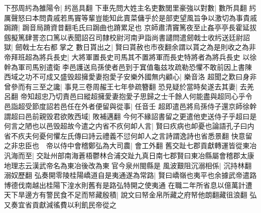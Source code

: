 下邳周䊸為雒陽令|{
	䊸邕具翻}
下車先問大姓主名吏數閭里豪強以對數|{
	數所具翻}
䊸厲聲怒曰本問貴戚若馬竇等輩豈能知此賣菜傭乎於是部吏望風旨争以激切為事貴戚跼蹐|{
	跼音局蹐資昔翻毛氏曰跼曲也蹐累足也}
京師肅清竇篤夜至止姦亭亭長霍延拔劔擬篤肆詈恣口篤以表聞詔召司隸校尉河南尹詣尚書譴問遣劒戟士收䊸送廷尉詔獄|{
	劒戟士左右都掌之}
數日貰出之|{
	賢曰貰赦也市夜翻余謂以貰之為是則收之為非}
帝拜班超為將兵長史|{
	大將軍置長史司馬其不置將軍而長史特將者為將兵長史}
以徐幹為軍司馬别遣衛李邑護送烏孫使者邑到于窴值龜兹攻疏勒恐懼不敢前因上書陳西域之功不可成又盛毁超擁愛妻抱愛子安樂外國無内顧心|{
	樂音洛}
超聞之歎曰身非曾參而有三至之讒|{
	事見三卷周赧王七年參疏簪翻}
恐見疑於當時矣遂去其妻|{
	去羌呂翻}
帝知超忠乃切責邑曰縱超擁愛妻抱愛子思歸之士千餘人何能盡與超同心乎令邑詣超受節度詔若邑任在外者便留與從事|{
	任音壬}
超即遣邑將烏孫侍子還京師徐幹謂超曰邑前親毁君欲敗西域|{
	敗補邁翻}
今何不緣詔書留之更遣他吏送侍子乎超曰是何言之陋也以邑毁超故今遣之内省不疚何卹人言|{
	賢曰疚病也卹憂也論語孔子曰内省不疚夫何憂何懼左氏傳曰詩云禮義不愆何卹人之言詩謂逸詩也省悉景翻}
快意留之非忠臣也　帝以侍中會稽鄭弘為大司農|{
	會工外翻}
舊交趾七郡貢獻轉運皆從東冶汎海而至|{
	交趾州部南海蒼梧鬱林合浦交趾九真日南七郡賢曰東冶縣屬會稽郡太康地理志云漢武帝名為東冶後改為東官今泉州閩縣是}
風波艱阻沉溺相係|{
	沉持林翻溺奴歷翻}
弘奏開零陵桂陽嶠道自是夷通遂為常路|{
	賢曰嶠嶺也夷平也余據武帝遣路博德伐南越出桂陽下湟水則舊有是路弘特開之使夷通}
在職二年所省息以億萬計遭天下旱邊方有警民食不足而帑藏殷積|{
	說文曰帑金帛所藏之府帑他朗翻藏徂浪翻}
弘又奏宜省貢獻減徭費以利飢民帝從之

